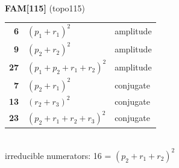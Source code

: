 \documentclass[10pt]{article}
\begin{document}
\begin{minipage}[t]{0.48\textwidth}
{}\\[2mm]\textbf{FAM[115]} (topo115)\\[2pt]{\footnotesize\begin{tabular}{@{}r@{\ \ }l@{\ \ }l@{}}\textbf{6} & $(p_1+r_1)^2$ & amplitude\\
\textbf{9} & $(p_2+r_2)^2$ & amplitude\\
\textbf{27} & $(p_1+p_2+r_1+r_2)^2$ & amplitude\\
\textbf{7} & $(p_2+r_1)^2$ & conjugate\\
\textbf{13} & $(r_2+r_3)^2$ & conjugate\\
\textbf{23} & $(p_2+r_1+r_2+r_3)^2$ & conjugate\\\end{tabular}}\\[2pt]{\scriptsize irreducible numerators: 16 = $(p_2+r_1+r_2)^2$}\end{minipage}

\bigskip
\end{document}
